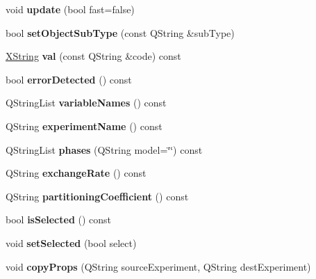 \begin{DoxyCompactItemize}
$$\item 
\mbox{\label{class_entity_a08f534efdbb05cb95de7875731c1e6bc}} 
void {\bfseries update} (bool fast=false)
\item 
\mbox{\label{class_entity_a0b525111cc2e2a3447377fd834603e7d}} 
bool {\bfseries set\+Object\+Sub\+Type} (const Q\+String \&sub\+Type)
\item 
\mbox{\label{class_entity_ade3d14a34348c249ec8d52ee42e46f78}} 
\hyperlink{class_x_string}{X\+String} {\bfseries val} (const Q\+String \&code) const
\item 
\mbox{\label{class_entity_ae3d3f78d740cf871b76a85342ae5658f}} 
bool {\bfseries error\+Detected} () const
\item 
\mbox{\label{class_entity_ad983e56891d32336ed798e7d6fa9ec21}} 
Q\+String\+List {\bfseries variable\+Names} () const
\item 
\mbox{\label{class_entity_a6fa5989706860a3f13b55556d506ba03}} 
Q\+String {\bfseries experiment\+Name} () const
\item 
\mbox{\label{class_entity_a3e7e2e07ff6d6004b009050357d95791}} 
Q\+String\+List {\bfseries phases} (Q\+String model=\char`\"{}\char`\"{}) const
\item 
\mbox{\label{class_entity_a2cb844a5292afffc71c80e80bb8ecf47}} 
Q\+String {\bfseries exchange\+Rate} () const
\item 
\mbox{\label{class_entity_a38418d100af915a77ec23b19c76c0393}} 
Q\+String {\bfseries partitioning\+Coefficient} () const
\item 
\mbox{\label{class_entity_aa75ca3c6951331dc45eafa1d640e5f06}} 
bool {\bfseries is\+Selected} () const
\item 
\mbox{\label{class_entity_ac341e131e903c4ad6f03399a4488ddab}} 
void {\bfseries set\+Selected} (bool select)
\item 
\mbox{\label{class_entity_a1d086f1352622450961e23c626090a91}} 
void {\bfseries copy\+Props} (Q\+String source\+Experiment, Q\+String dest\+Experiment)
\end{DoxyCompactItemize}

